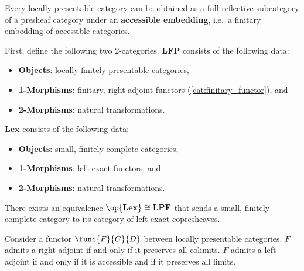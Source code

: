     \begin{property}
        Every locally presentable category can be obtained as a full reflective subcategory of a presheaf category under an \textbf{accessible embedding}, i.e.~a finitary embedding of accessible categories.
    \end{property}
    \begin{property}
        First, define the following two 2-categories. $\mathbf{LFP}$ consists of the following data:
        \begin{itemize}
            \item\textbf{Objects}: locally finitely presentable categories,
            \item\textbf{1-Morphisms}: finitary, right adjoint functors (\cref{cat:finitary_functor}), and
            \item\textbf{2-Morphisms}: natural transformations.
        \end{itemize}
        $\mathbf{Lex}$ consists of the following data:
        \begin{itemize}
            \item\textbf{Objects}: small, finitely complete categories,
            \item\textbf{1-Morphisms}: left exact functors, and
            \item\textbf{2-Morphisms}: natural transformations.
        \end{itemize}
        There exists an equivalence $\op{\mathbf{Lex}}\cong\mathbf{LPF}$ that sends a small, finitely complete category to its category of left exact copresheaves.
    \end{property}

    \begin{theorem}\label{cat:adjoint_functor_theorem}
        Consider a functor $\func{F}{C}{D}$ between locally presentable categories. $F$ admits a right adjoint if and only if it preserves all colimits. $F$ admits a left adjoint if and only if it is accessible and if it preserves all limits.
    \end{theorem}

